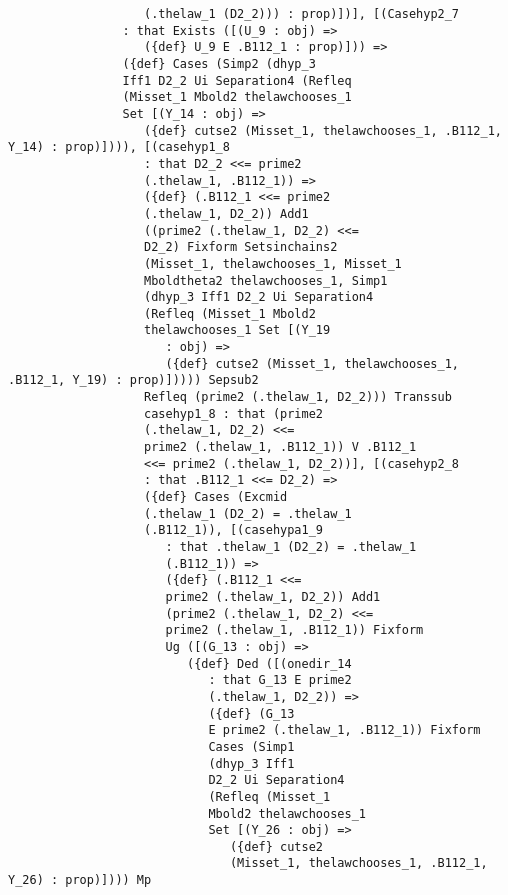 \documentclass[12pt]{article}
\begin{document}
\begin{verbatim}
                   (.thelaw_1 (D2_2))) : prop)])], [(Casehyp2_7 
                : that Exists ([(U_9 : obj) => 
                   ({def} U_9 E .B112_1 : prop)])) => 
                ({def} Cases (Simp2 (dhyp_3 
                Iff1 D2_2 Ui Separation4 (Refleq 
                (Misset_1 Mbold2 thelawchooses_1 
                Set [(Y_14 : obj) => 
                   ({def} cutse2 (Misset_1, thelawchooses_1, .B112_1, Y_14) : prop)]))), [(casehyp1_8 
                   : that D2_2 <<= prime2 
                   (.thelaw_1, .B112_1)) => 
                   ({def} (.B112_1 <<= prime2 
                   (.thelaw_1, D2_2)) Add1 
                   ((prime2 (.thelaw_1, D2_2) <<= 
                   D2_2) Fixform Setsinchains2 
                   (Misset_1, thelawchooses_1, Misset_1 
                   Mboldtheta2 thelawchooses_1, Simp1 
                   (dhyp_3 Iff1 D2_2 Ui Separation4 
                   (Refleq (Misset_1 Mbold2 
                   thelawchooses_1 Set [(Y_19 
                      : obj) => 
                      ({def} cutse2 (Misset_1, thelawchooses_1, .B112_1, Y_19) : prop)])))) Sepsub2 
                   Refleq (prime2 (.thelaw_1, D2_2))) Transsub 
                   casehyp1_8 : that (prime2 
                   (.thelaw_1, D2_2) <<= 
                   prime2 (.thelaw_1, .B112_1)) V .B112_1 
                   <<= prime2 (.thelaw_1, D2_2))], [(casehyp2_8 
                   : that .B112_1 <<= D2_2) => 
                   ({def} Cases (Excmid 
                   (.thelaw_1 (D2_2) = .thelaw_1 
                   (.B112_1)), [(casehypa1_9 
                      : that .thelaw_1 (D2_2) = .thelaw_1 
                      (.B112_1)) => 
                      ({def} (.B112_1 <<= 
                      prime2 (.thelaw_1, D2_2)) Add1 
                      (prime2 (.thelaw_1, D2_2) <<= 
                      prime2 (.thelaw_1, .B112_1)) Fixform 
                      Ug ([(G_13 : obj) => 
                         ({def} Ded ([(onedir_14 
                            : that G_13 E prime2 
                            (.thelaw_1, D2_2)) => 
                            ({def} (G_13 
                            E prime2 (.thelaw_1, .B112_1)) Fixform 
                            Cases (Simp1 
                            (dhyp_3 Iff1 
                            D2_2 Ui Separation4 
                            (Refleq (Misset_1 
                            Mbold2 thelawchooses_1 
                            Set [(Y_26 : obj) => 
                               ({def} cutse2 
                               (Misset_1, thelawchooses_1, .B112_1, Y_26) : prop)]))) Mp 

\end{verbatim}
\end{document}
